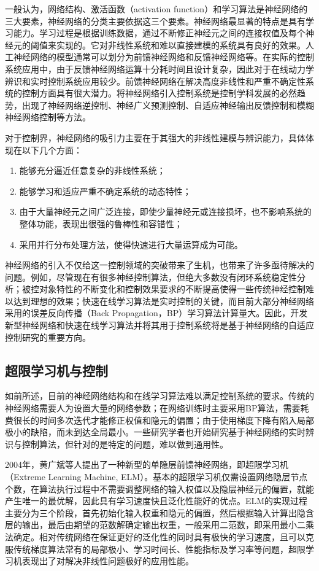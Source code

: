 一般认为，网络结构、激活函数（activation function）和学习算法是神经网络的三大要素，神经网络的分类主要依据这三个要素。神经网络最显著的特点是具有学习能力。学习过程是根据训练数据，通过不断修正神经元之间的连接权值及每个神经元的阈值来实现的。它对非线性系统和难以直接建模的系统具有良好的效果。人工神经网络的模型通常可以划分为前馈神经网络和反馈神经网络等。在实际的控制系统应用中，由于反馈神经网络运算十分耗时间且设计复杂，因此对于在线动力学辨识和实时控制系统应用较少。前馈神经网络在解决高度非线性和严重不确定性系统的控制方面具有很大潜力。将神经网络引入控制系统是控制学科发展的必然趋势，出现了神经网络逆控制、神经广义预测控制、自适应神经输出反馈控制和模糊神经网络控制等方法。

对于控制界，神经网络的吸引力主要在于其强大的非线性建模与辨识能力，具体体现在以下几个方面：
\begin{enumerate}
\item 能够充分逼近任意复杂的非线性系统；
\item 能够学习和适应严重不确定系统的动态特性；
\item 由于大量神经元之间广泛连接，即使少量神经元或连接损坏，也不影响系统的整体功能，表现出很强的鲁棒性和容错性；
\item 采用并行分布处理方法，使得快速进行大量运算成为可能。
\end{enumerate}

神经网络的引入不仅给这一控制领域的突破带来了生机，也带来了许多亟待解决的问题。例如，尽管现在有很多神经控制算法，但绝大多数没有闭环系统稳定性分析；被控对象特性的不断变化和控制效果要求的不断提高使得一些传统神经控制难以达到理想的效果；快速在线学习算法是实时控制的关键，而目前大部分神经网络采用的误差反向传播（Back Propagation，BP）学习算法计算量大。因此，开发新型神经网络和快速在线学习算法并将其用于控制系统将是基于神经网络的自适应控制研究的重要方向。

\subsection{超限学习机与控制}

如前所述，目前的神经网络结构和在线学习算法难以满足控制系统的要求。传统的神经网络需要人为设置大量的网络参数；在网络训练时主要采用BP算法，需要耗费很长的时间多次迭代才能修正权值和隐元的偏置；由于使用梯度下降有陷入局部极小的缺陷，而未到达全局最小。一些研究学者也开始研究基于神经网络的实时辨识与控制算法，但针对的是特定的问题，难以做到通用性。

2004年，黄广斌等人提出了一种新型的单隐层前馈神经网络，即超限学习机（Extreme Learning Machine, ELM）。基本的超限学习机仅需设置网络隐层节点个数，在算法执行过程中不需要调整网络的输入权值以及隐层神经元的偏置，就能产生唯一的最优解，因此具有学习速度快且泛化性能好的优点。ELM的实现过程主要分为三个阶段，首先初始化输入权重和隐元的偏置，然后根据输入计算出隐含层的输出，最后由期望的范数解确定输出权重，一般采用二范数，即采用最小二乘法确定。相对传统网络在保证更好的泛化性的同时具有极快的学习速度，且可以克服传统梯度算法常有的局部极小、学习时间长、性能指标及学习率等问题，超限学习机表现出了对解决非线性问题极好的应用性能。

